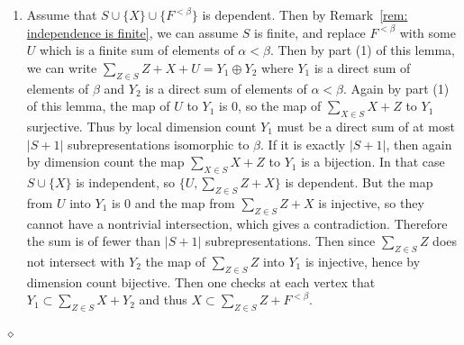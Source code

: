 \documentclass{article}
\newenvironment{proof}{\vspace*{2ex}\noindent {\em Proof:}
}{\hfill $\diamond$ \\[2ex]}
\begin{document}
\begin{proof}
\begin{enumerate}
    \item Assume that $S \cup \{X\} \cup \{F^{<\beta}\}$ is dependent. Then by Remark~\ref{rem: independence is finite}, we can assume $S$ is finite,  and replace $F^{<\beta}$ with some $U$ which is a finite sum of elements of $\alpha<\beta$.   Then by  part (1) of this lemma, we can write  $\sum_{Z \in S} Z + X + U= Y_1 \oplus Y_2$ where $Y_1$ is a direct sum of elements of $\beta$ and $Y_2$ is a direct sum of elements of $\alpha<\beta$.  Again by part (1) of this lemma, the map of $U$ to $Y_1$ is $0$,  so the map of $\sum_{X \in S} X + Z$ to $Y_1$  surjective. Thus by local dimension count $Y_1$ must be a direct sum of at most $|S+1|$ subrepresentations isomorphic to $\beta$. If it is exactly $|S+1|$, then again by dimension count the map  $\sum_{X \in S} X + Z$ to $Y_1$  is a bijection. In that case $S \cup \{X\}$ is independent, so $\{U, \sum_{Z \in S} Z + X\}$ is dependent.  But the map from $U$ into $Y_1$ is $0$ and the map from $ \sum_{Z \in S} Z + X$ is injective, so they cannot have a nontrivial intersection, which gives a contradiction.  Therefore the sum is of fewer than $|S+1|$ subrepresentations. Then  since  $\sum_{Z \in S} Z$ does not intersect with $Y_2$  the map of $\sum_{Z \in S} Z$ into $Y_1$ is injective, hence by dimension count bijective. Then  one checks at each vertex that $Y_1 \subset \sum_{Z \in S} X + Y_2$ and thus $X \subset \sum_{Z \in S} Z + F^{<\beta}$.  

\end{enumerate}
\end{proof}
\end{document}

